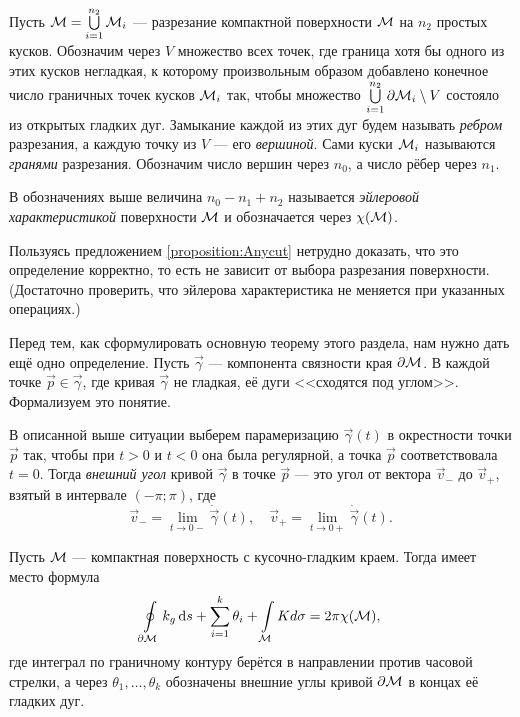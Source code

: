 Пусть $\mathcal{M} = \bigcup\limits_{i = 1}^{n_2}\mathcal{M}_i$ --- разрезание компактной поверхности $\mathcal{M}$ на $n_2$ простых кусков. Обозначим через $V$ множество всех точек, где граница хотя бы одного из этих кусков негладкая, к которому произвольным образом добавлено конечное число граничных точек кусков $\mathcal{M}_i$ так, чтобы множество $\bigcup\limits_{i = 1}^{n_2}\partial\mathcal{M}_i \setminus V$ состояло из открытых гладких дуг. Замыкание каждой из этих дуг будем называть \textit{ребром} разрезания, а каждую точку из $V$ --- его \textit{вершиной}. Сами куски $\mathcal{M}_i$ называются \textit{гранями} разрезания. Обозначим число вершин через $n_0$, а число рёбер через $n_1$.

\begin{definition}
	В обозначениях выше величина $n_0 - n_1 + n_2$ называется \textit{эйлеровой характеристикой} поверхности $\mathcal{M}$ и обозначается через $\chi(\mathcal{M})$.
\end{definition}

Пользуясь предложением \ref{proposition:Anycut} нетрудно доказать, что это определение корректно, то есть не зависит от выбора разрезания поверхности. (Достаточно проверить, что эйлерова характеристика не меняется при указанных операциях.)

Перед тем, как сформулировать основную теорему этого раздела, нам нужно дать ещё одно определение. Пусть $\vec{\gamma}$ --- компонента связности края $\partial\mathcal{M}$. В каждой точке $\vec{p} \in \vec{\gamma}$, где кривая $\vec{\gamma}$ не гладкая, её дуги <<сходятся под углом>>. Формализуем это понятие.

\begin{definition}
	В описанной выше ситуации выберем парамеризацию $\vec{\gamma}(t)$ в окрестности точки $\vec{p}$ так, чтобы при $t > 0$ и $t < 0$ она была регулярной, а точка $\vec{p}$ соответствовала $t = 0$. Тогда \textit{внешний угол} кривой $\vec{\gamma}$ в точке $\vec{p}$ --- это угол от вектора $\vec{v}_{-}$ до $\vec{v}_{+}$, взятый в интервале $(-\pi; \pi)$, где
	\[
		\vec{v}_{-} = \lim_{t \to 0-}\dot{\vec{\gamma}}(t),\quad
		\vec{v}_{+} = \lim_{t \to 0+}\dot{\vec{\gamma}}(t).
	\]
\end{definition} %

\begin{theorem}
	Пусть $\mathcal{M}$ --- компактная поверхность с кусочно-гладким краем. Тогда имеет место формула
	\begin{equation} \label{eq:GaussBonnet}
		\oint\limits_{\partial \mathcal{M}}k_g\mathop{}\!\mathrm{d} s + \sum_{i = 1}^k\theta_i + \int\limits_{\mathcal{M}}K\\d\sigma = 2\pi\chi(\mathcal{M}),
	\end{equation}
	где интеграл по граничному контуру берётся в направлении против часовой стрелки, а через $\theta_1, \ldots, \theta_k$ обозначены внешние углы кривой $\partial \mathcal{M}$ в концах её гладких дуг.
\end{theorem}

